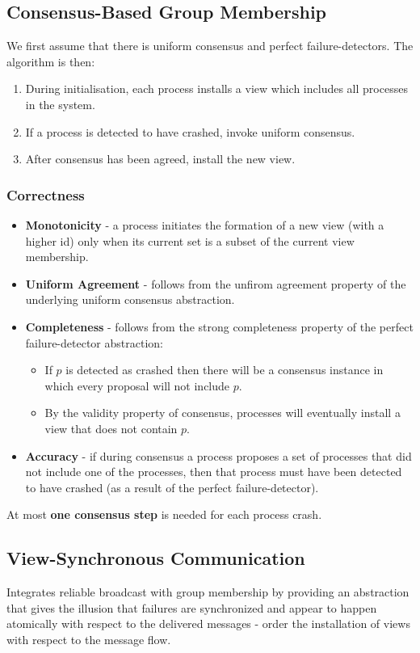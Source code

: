 \documentclass[11pt]{article}
\begin{document}
\subsection{Consensus-Based Group Membership}
We first assume that there is uniform consensus and perfect failure-detectors.
The algorithm is then:
\begin{enumerate}
  \item During initialisation, each process installs a view which includes all processes in the system.
  \item If a process is detected to have crashed, invoke uniform consensus.
  \item After consensus has been agreed, install the new view.
\end{enumerate}

\subsubsection{Correctness}
\begin{itemize}
  \item \textbf{Monotonicity} - a process initiates the formation of a new view (with a higher id) only when its current set is a subset of the current view membership.
  \item \textbf{Uniform Agreement} - follows from the unfirom agreement property of the underlying uniform consensus abstraction.
  \item \textbf{Completeness} - follows from the strong completeness property of the perfect failure-detector abstraction:
    \begin{itemize}
      \item If $p$ is detected as crashed then there will be a consensus instance in which every proposal will not include $p$.
      \item By the validity property of consensus, processes will eventually install a view that does not contain $p$.
    \end{itemize}
  \item \textbf{Accuracy} - if during consensus a process proposes a set of processes that did not include one of the processes, then that process must have been detected to have crashed (as a result of the perfect failure-detector).
\end{itemize}

At most \textbf{one consensus step} is needed for each process crash.

\subsection{View-Synchronous Communication}
Integrates reliable broadcast with group membership by providing an abstraction that gives  the illusion that failures are synchronized and appear to happen atomically with respect to the delivered messages - order the installation of views with respect to the message flow.
\end{document}

